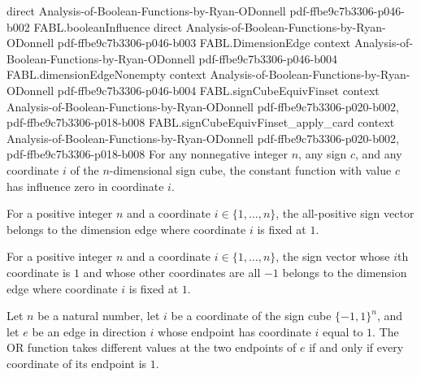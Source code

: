 \begin{theorem}
  {direct}
  {Analysis-of-Boolean-Functions-by-Ryan-ODonnell}
  {pdf-ffbe9c7b3306-p046-b002}
\proofstep
  {FABL.booleanInfluence}
  {direct}
  {Analysis-of-Boolean-Functions-by-Ryan-ODonnell}
  {pdf-ffbe9c7b3306-p046-b003}
\proofstep
  {FABL.DimensionEdge}
  {context}
  {Analysis-of-Boolean-Functions-by-Ryan-ODonnell}
  {pdf-ffbe9c7b3306-p046-b004}
\proofstep
  {FABL.dimensionEdgeNonempty}
  {context}
  {Analysis-of-Boolean-Functions-by-Ryan-ODonnell}
  {pdf-ffbe9c7b3306-p046-b004}
\proofstep
  {FABL.signCubeEquivFinset}
  {context}
  {Analysis-of-Boolean-Functions-by-Ryan-ODonnell}
  {pdf-ffbe9c7b3306-p020-b002,
    pdf-ffbe9c7b3306-p018-b008}
\proofstep
  {FABL.signCubeEquivFinset_apply_card}
  {context}
  {Analysis-of-Boolean-Functions-by-Ryan-ODonnell}
  {pdf-ffbe9c7b3306-p020-b002,
    pdf-ffbe9c7b3306-p018-b008}
For any nonnegative integer $n$, any sign $c$, and any coordinate $i$ of the
$n$-dimensional sign cube, the constant function with value $c$ has influence zero in
coordinate $i$.
\end{theorem}

\begin{definition}
\label{FABL.allOneDimensionEdge}
\leanok
{}
For a positive integer $n$ and a coordinate $i\in\{1,\ldots,n\}$, the all-positive sign
vector belongs to the dimension edge where coordinate $i$ is fixed at $1$.
\end{definition}

\begin{definition}
\label{FABL.allNegOneDimensionEdge}
\leanok
{}
For a positive integer $n$ and a coordinate $i\in\{1,\ldots,n\}$, the sign vector whose
$i$th coordinate is $1$ and whose other coordinates are all $-1$ belongs to the
dimension edge where coordinate $i$ is fixed at $1$.
\end{definition}

\begin{theorem}
\label{FABL.isBoundaryDimensionEdge_orFunction_iff}
\leanok
{}
Let $n$ be a natural number, let $i$ be a coordinate of the sign cube $\{-1,1\}^n$,
and let $e$ be an edge in direction $i$ whose endpoint has coordinate $i$ equal to $1$.
The OR function takes different values at the two endpoints of $e$ if and only if every
coordinate of its endpoint is $1$.
\end{theorem}

